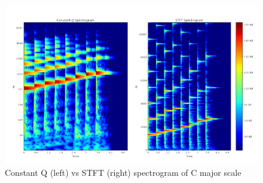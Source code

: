 \begin{figure}[h]
	\caption[Constant Q vs STFT spectrogram of C major scale]{ Constant Q (left) vs STFT (right) spectrogram of C major scale}
	\centering
	\label{fig:cq_vs_stft}
	\includegraphics[width=1\textwidth, height=\textheight, keepaspectratio]{"resources/Q_vs_STFT"}
\end{figure}